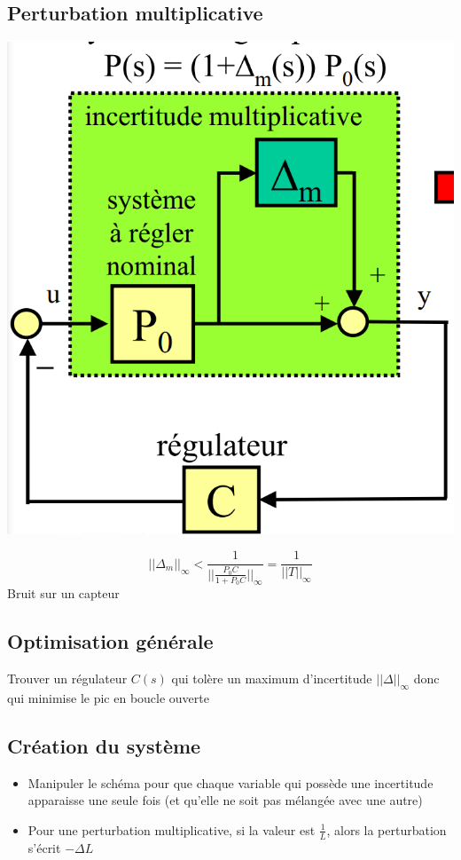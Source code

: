 \documentclass[resume]{subfiles}
\begin{document}
\subsection{Perturbation multiplicative}

\begin{center}
\includegraphics[width=0.5\columnwidth]{FiguresTypora/image-20220602100455177.png}
\end{center}

$$||\Delta_m||_{\infty} < \frac{1}{||\frac{P_0C}{1+P_0C}||_{\infty}}= \frac{1}{||T||_{\infty}}$$
Bruit sur un capteur

\subsection{Optimisation générale}

Trouver un régulateur $C(s)$ qui tolère un maximum d'incertitude $||\Delta||_{\infty}$ donc qui minimise le pic en boucle ouverte 

\subsection{Création du système}
\begin{itemize}
\item Manipuler le schéma pour que chaque variable qui possède une incertitude apparaisse une seule fois (et qu'elle ne soit pas mélangée avec une autre)
\item Pour une perturbation multiplicative, si la valeur est $\frac{1}{L}$, alors la perturbation s'écrit $-\Delta L$
\end{itemize}
\end{document}
